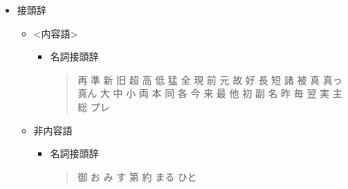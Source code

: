 \documentclass[a4j]{jarticle}
\newcommand{\sm}[1]{\textless #1\textgreater}
\begin{document}
\begin{itemize}
 \item 接頭辞
       \begin{itemize}
	\item \sm{内容語}
	      \begin{itemize}
	       \item 名詞接頭辞
		     \begin{quote}
		      再 準 新 旧 超 高 低 猛 全 現 前 元 故 好 長 短 諸 被 真 真っ 真ん 大 中 小 両 本 同 各 今 来 最 他 初 副 名 昨 毎 翌 実 主 総 プレ
		     \end{quote}
	      \end{itemize}
	\item 非内容語

	      \begin{itemize}
	       \item 名詞接頭辞
		     \begin{quote}
		      御 お み す 第 約 まる ひと
		     \end{quote}


\end{itemize}
\end{itemize}
\end{itemize}
\end{document}
